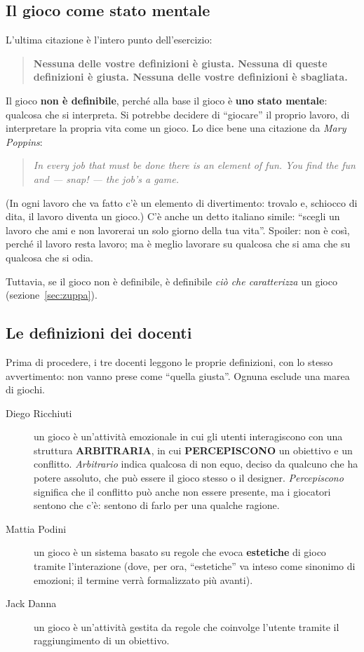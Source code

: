 \subsection{Il gioco come stato mentale}

L'ultima citazione è l'intero punto dell'esercizio:
\begin{quote}
\centering
\textbf{Nessuna delle vostre definizioni è giusta. Nessuna di queste
definizioni è giusta. Nessuna delle vostre definizioni è sbagliata.}
\end{quote}
Il gioco \textbf{non è definibile}, perché alla base il gioco è
\textbf{uno stato mentale}: qualcosa che si interpreta. Si potrebbe decidere
di ``giocare'' il proprio lavoro, di interpretare la propria vita come un
gioco. Lo dice bene una citazione da \emph{Mary Poppins}:
\begin{quote}
\emph{In every job that must be done there is an element of fun. You find the
fun and --- snap! --- the job's a game.}
\end{quote}
(In ogni lavoro che va fatto c'è un elemento di divertimento: trovalo e,
schiocco di dita, il lavoro diventa un gioco.) C'è anche un detto italiano
simile: ``scegli un lavoro che ami e non lavorerai un solo giorno della tua
vita''. Spoiler: non è così, perché il lavoro resta lavoro; ma è meglio
lavorare su qualcosa che si ama che su qualcosa che si odia.

Tuttavia, se il gioco non è definibile, è definibile \emph{ciò che
caratterizza} un gioco (sezione~\ref{sec:zuppa}).

\subsection{Le definizioni dei docenti}

Prima di procedere, i tre docenti leggono le proprie definizioni, con lo
stesso avvertimento: non vanno prese come ``quella giusta''. Ognuna esclude una
marea di giochi.

\begin{description}
  \item[Diego Ricchiuti] un gioco è un'attività emozionale in cui gli utenti
        interagiscono con una struttura \textbf{ARBITRARIA}, in cui
        \textbf{PERCEPISCONO} un obiettivo e un conflitto. \emph{Arbitrario}
        indica qualcosa di non equo, deciso da qualcuno che ha potere assoluto,
        che può essere il gioco stesso o il designer. \emph{Percepiscono}
        significa che il conflitto può anche non essere presente, ma i
        giocatori sentono che c'è: sentono di farlo per una qualche ragione.
  \item[Mattia Podini] un gioco è un sistema basato su regole che evoca
        \textbf{estetiche} di gioco tramite l'interazione (dove, per ora,
        ``estetiche'' va inteso come sinonimo di emozioni; il termine verrà
        formalizzato più avanti).
  \item[Jack Danna] un gioco è un'attività gestita da regole che coinvolge
        l'utente tramite il raggiungimento di un obiettivo.
\end{description}

